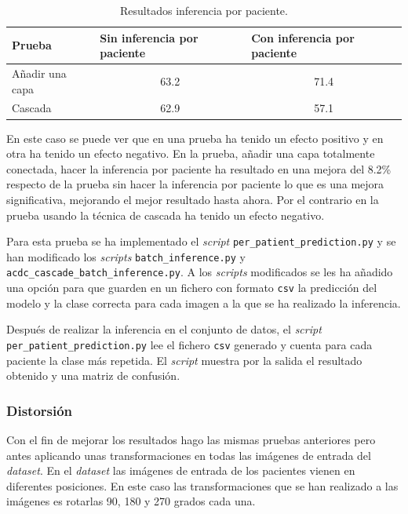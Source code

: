 \documentclass[12pt,a4paper]{article}
\begin{document}
\begin{table}[H]
\centering
\begin{tabular}{|l|c|c|}
\hline
\textbf{Prueba} & \multicolumn{1}{l|}{\textbf{Sin inferencia por paciente}} & \multicolumn{1}{l|}{\textbf{Con inferencia por paciente}} \\ \hline
Añadir una capa & 63.2                                                      & 71.4                                                      \\ \hline
Cascada         & 62.9                                                      & 57.1                                                      \\ \hline
\end{tabular}
\caption{Resultados inferencia por paciente.}
\end{table}

En este caso se puede ver que en una prueba ha tenido un efecto positivo y en otra ha tenido un efecto negativo. En la prueba, añadir una capa totalmente conectada, hacer la inferencia por paciente ha resultado en una mejora del 8.2\% respecto de la prueba sin hacer la inferencia por paciente lo que es una mejora significativa, mejorando el mejor resultado hasta ahora. Por el contrario en la prueba usando la técnica de cascada ha tenido un efecto negativo.
\bigskip

Para esta prueba se ha implementado el \textit{script} \texttt{per\_patient\_prediction.py} y se han modificado los \textit{scripts} \texttt{batch\_inference.py} y \texttt{acdc\_cascade\_batch\_inference.py}. A los \textit{scripts} modificados se les ha añadido una opción para que guarden en un fichero con formato \texttt{csv} la predicción del modelo y la clase correcta para cada imagen a la que se ha realizado la inferencia.
\bigskip

Después de realizar la inferencia en el conjunto de datos, el \textit{script} \texttt{per\_patient\_prediction.py} lee el fichero \texttt{csv} generado y cuenta para cada paciente la clase más repetida. El \textit{script} muestra por la salida el resultado obtenido y una matriz de confusión.

\subsubsection{Distorsión}
Con el fin de mejorar los resultados hago las mismas pruebas anteriores pero antes aplicando unas transformaciones en todas las imágenes de entrada del \textit{dataset}. En el \textit{dataset} las imágenes de entrada de los pacientes vienen en diferentes posiciones. En este caso las transformaciones que se han realizado a las imágenes es rotarlas 90, 180 y 270 grados cada una.
\bigskip
\end{document}
